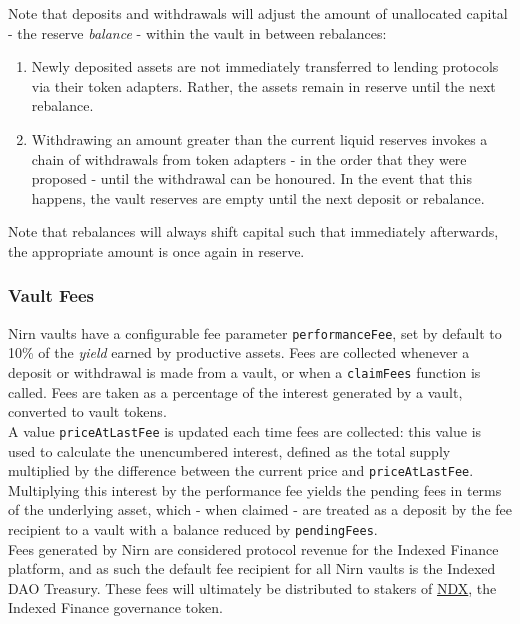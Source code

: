 \documentclass{article}
\begin{document}
\noindent
Note that deposits and withdrawals will adjust the amount of unallocated capital - the reserve \textit{balance} - within the vault in between rebalances:

\begin{enumerate}
    \item Newly deposited assets are not immediately transferred to lending protocols via their token adapters. Rather, the assets remain in reserve until the next rebalance.
    \item Withdrawing an amount greater than the current liquid reserves invokes a chain of withdrawals from token adapters - in the order that they were proposed - until the withdrawal can be honoured. In the event that this happens, the vault reserves are empty until the next deposit or rebalance.
\end{enumerate}

\noindent
Note that rebalances will always shift capital such that immediately afterwards, the appropriate amount is once again in reserve.

\newpage
\subsubsection{Vault Fees}
\label{fees}

Nirn vaults have a configurable fee parameter \texttt{performanceFee}, set by default to 10\% of the \textit{yield} earned by productive assets. Fees are collected whenever a deposit or withdrawal is made from a vault, or when a \texttt{claimFees} function is called. Fees are taken as a percentage of the interest generated by a vault, converted to vault tokens.\\

\noindent
A value \texttt{priceAtLastFee} is updated each time fees are collected: this value is used to calculate the unencumbered interest, defined as the total supply multiplied by the difference between the current price and \texttt{priceAtLastFee}. Multiplying this interest by the performance fee yields the pending fees in terms of the underlying asset, which - when claimed - are treated as a deposit by the fee recipient to a vault with a balance reduced by \texttt{pendingFees}.\\

\noindent
Fees generated by Nirn are considered protocol revenue for the Indexed Finance platform, and as such the default fee recipient for all Nirn vaults is the Indexed DAO Treasury. These fees will ultimately be distributed to stakers of \href{https://www.coingecko.com/en/coins/indexed-finance}{NDX}, the Indexed Finance governance token.
\end{document}

